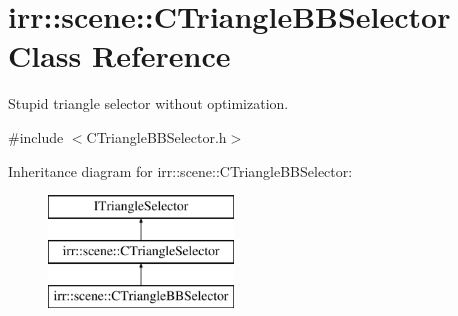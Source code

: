 \hypertarget{classirr_1_1scene_1_1_c_triangle_b_b_selector}{\section{irr\-:\-:scene\-:\-:C\-Triangle\-B\-B\-Selector Class Reference}
\label{classirr_1_1scene_1_1_c_triangle_b_b_selector}
}


Stupid triangle selector without optimization.  




{\ttfamily \#include $<$C\-Triangle\-B\-B\-Selector.\-h$>$}

Inheritance diagram for irr\-:\-:scene\-:\-:C\-Triangle\-B\-B\-Selector\-:\begin{figure}[H]
\begin{center}
\leavevmode
\includegraphics[height=3.000000cm]{classirr_1_1scene_1_1_c_triangle_b_b_selector}
\end{center}
\end{figure}
